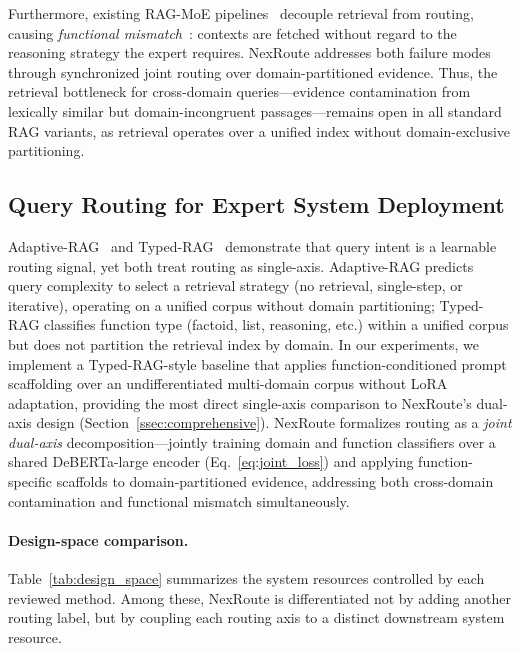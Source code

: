 \documentclass[a4paper,fleql,doubleblind]{cas-sc}
\begin{document}
Furthermore, existing RAG-MoE pipelines~\citep{jeong2024adaptiverag,dou2024loramoe} decouple retrieval from routing, causing \emph{functional mismatch}~\citep{hu2024routerbench}: contexts are fetched without regard to the reasoning strategy the expert requires. NexRoute addresses both failure modes through synchronized joint routing over domain-partitioned evidence.
Thus, the retrieval bottleneck for cross-domain queries---evidence contamination from lexically similar but domain-incongruent passages---remains open in all standard RAG variants, as retrieval operates over a unified index without domain-exclusive partitioning.

\subsection{Query Routing for Expert System Deployment}
Adaptive-RAG~\citep{jeong2024adaptiverag} and Typed-RAG~\citep{typedrag} demonstrate that query intent is a learnable routing signal, yet both treat routing as single-axis. Adaptive-RAG predicts query complexity to select a retrieval strategy (no retrieval, single-step, or iterative), operating on a unified corpus without domain partitioning; Typed-RAG classifies function type (factoid, list, reasoning, etc.) within a unified corpus but does not partition the retrieval index by domain. In our experiments, we implement a Typed-RAG-style baseline that applies function-conditioned prompt scaffolding over an undifferentiated multi-domain corpus without LoRA adaptation, providing the most direct single-axis comparison to NexRoute's dual-axis design (Section~\ref{ssec:comprehensive}). NexRoute formalizes routing as a \emph{joint dual-axis} decomposition---jointly training domain and function classifiers over a shared DeBERTa-large encoder (Eq.~\ref{eq:joint_loss}) and applying function-specific scaffolds to domain-partitioned evidence, addressing both cross-domain contamination and functional mismatch simultaneously.

\paragraph{Design-space comparison.}
Table~\ref{tab:design_space} summarizes the system resources controlled by each reviewed method.
Among these, NexRoute is differentiated not by adding another routing label, but by coupling each routing axis to a distinct downstream system resource.
\end{document}

